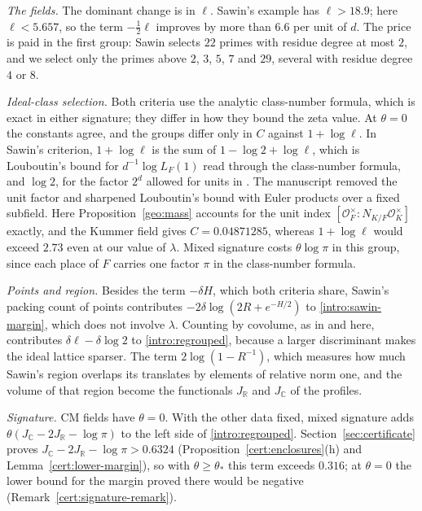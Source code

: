 \documentclass[11pt]{amsart}
\numberwithin{equation}{section}
\theoremstyle{definition}
\theoremstyle{remark}
\newcommand{\R}{\mathbb R}
\newcommand{\C}{\mathbb C}
\newcommand{\ceiling}{0.04871285}
\begin{document}
\emph{The fields.} The dominant change is in $\ell$. Sawin's example has
$\ell>18.9$; here $\ell<5.657$, so the term $-\frac12\ell$ improves by
more than $6.6$ per unit of $d$. The price is paid in the first group:
Sawin selects $22$ primes with residue degree at most $2$, and we select
only the primes above $2$, $3$, $5$, $7$ and $29$, several with residue
degree $4$ or $8$.

\emph{Ideal-class selection.} Both criteria use the analytic class-number
formula, which is exact in either signature; they differ in how they
bound the zeta value. At $\theta=0$ the constants agree, and the groups
differ only in $C$ against $1+\log\ell$. In Sawin's criterion,
$1+\log\ell$ is the sum of $1-\log2+\log\ell$, which is Louboutin's
bound \cite[Corollary~3]{Louboutin2000} for $d^{-1}\log L_F(1)$ read
through the class-number formula, and $\log2$, for the factor $2^d$
allowed for units in
\cite[Lemma~6]{Sawin2026}. The manuscript \cite{Naslund0358} removed the
unit factor and sharpened Louboutin's bound with Euler products over a
fixed subfield. Here Proposition~\ref{geo:mass} accounts for the unit
index $[\mathcal O_F^\times:N_{K/F}\mathcal O_K^\times]$ exactly, and the Kummer field gives $C=\ceiling$, whereas
$1+\log\ell$ would exceed $2.73$ even at our value of $\lambda$. Mixed
signature costs $\theta\log\pi$ in this group, since each place of $F$
carries one factor $\pi$ in the class-number formula.

\emph{Points and region.} Besides the term $-\delta H$, which both
criteria share, Sawin's packing count of points contributes
$-2\delta\log(2R+e^{-H/2})$ to \eqref{intro:sawin-margin}, which does not
involve $\lambda$. Counting by covolume, as in \cite{Naslund0358} and
here, contributes $\delta\ell-\delta\log2$ to \eqref{intro:regrouped},
because a larger discriminant makes the ideal lattice sparser. The term $2\log(1-R^{-1})$, which measures how much Sawin's
region overlaps its translates by elements of relative norm one, and
the volume of that region become the functionals $J_\R$ and $J_\C$ of
the profiles.

\emph{Signature.} CM fields have $\theta=0$. With the other data fixed,
mixed signature adds $\theta(J_\C-2J_\R-\log\pi)$ to the left side of
\eqref{intro:regrouped}. Section~\ref{sec:certificate} proves
$J_\C-2J_\R-\log\pi>0.6324$ (Proposition~\ref{cert:enclosures}(h) and
Lemma~\ref{cert:lower-margin}), so
with $\theta\ge\theta_*$ this term exceeds $0.316$; at $\theta=0$ the
lower bound for the margin proved there would be negative
(Remark~\ref{cert:signature-remark}).
\end{document}
